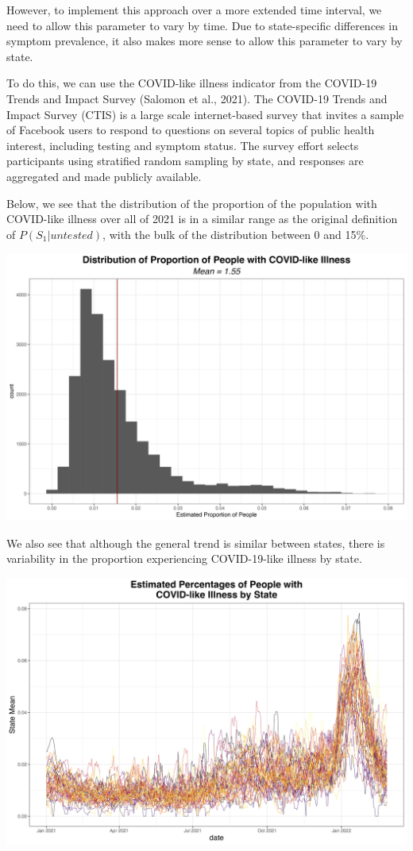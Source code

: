 \documentclass[12pt,twoside]{smiththesis}
\begin{document}
However, to implement this approach over a more extended time interval, we need to allow this parameter to vary by time. Due to state-specific differences in symptom prevalence, it also makes more sense to allow this parameter to vary by state.

To do this, we can use the COVID-like illness indicator from the COVID-19 Trends and Impact Survey (Salomon et al., 2021). The COVID-19 Trends and Impact Survey (CTIS) is a large scale internet-based survey that invites a sample of Facebook users to respond to questions on several topics of public health interest, including testing and symptom status. The survey effort selects participants using stratified random sampling by state, and responses are aggregated and made publicly available.

Below, we see that the distribution of the proportion of the population with COVID-like illness over all of 2021 is in a similar range as the original definition of \(P(S_1|untested)\), with the bulk of the distribution between 0 and 15\%.

\includegraphics[width=0.8\linewidth]{./figure/emp_distribution_p_s_untested}

We also see that although the general trend is similar between states, there is variability in the proportion experiencing COVID-19-like illness by state.

\includegraphics[width=0.8\linewidth]{./figure/cli_by_state}
\end{document}
